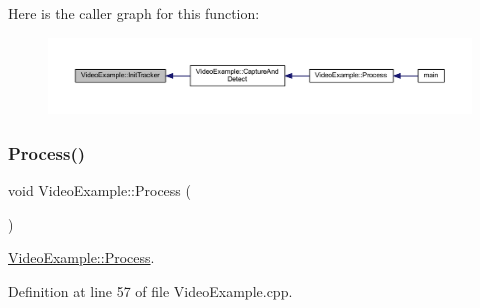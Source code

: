 Here is the caller graph for this function\+:\nopagebreak
\begin{figure}[H]
\begin{center}
\leavevmode
\includegraphics[width=350pt]{class_video_example_a93e23d64075fb2f508423e45d15c5421_icgraph}
\end{center}
\end{figure}
\mbox{\label{class_video_example_a87efc66a82c36ad3380623d30a12abf2}} 
\subsubsection{\texorpdfstring{Process()}{Process()}}
{\footnotesize\ttfamily void Video\+Example\+::\+Process (\begin{DoxyParamCaption}{ }\end{DoxyParamCaption})}



\mbox{\hyperlink{class_video_example_a87efc66a82c36ad3380623d30a12abf2}{Video\+Example\+::\+Process}}. 



Definition at line 57 of file Video\+Example.\+cpp.


